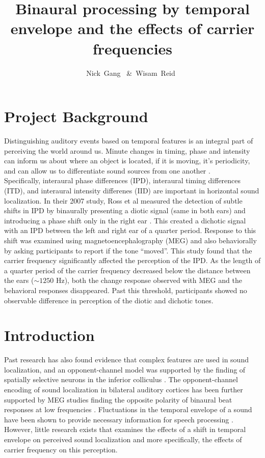 \documentclass[12pt,journal,compsoc,twocolumn]{IEEEtran}
\title{\textbf{Binaural processing by temporal envelope and the effects of carrier frequencies}}
\author{Nick~Gang~\IEEEmembership{}
        \&~Wisam~Reid~\IEEEmembership{}
\IEEEcompsocitemizethanks{\IEEEcompsocthanksitem W. Reid and N. Gang are with the Department
of Music, Stanford University,
CA, 94305.\protect
~Web: wisamreid.com, orangagang.com
}%
}
\begin{document}
\maketitle


\section{Project Background}
Distinguishing auditory events based on temporal features is an integral part of perceiving the world around us.  Minute changes in timing, phase and intensity can inform us about where an object is located, if it is moving, it’s periodicity, and can allow us to differentiate sound sources from one another \cite{Picton:2013}.\\

Specifically, interaural phase differences (IPD), interaural timing differences (ITD), and interaural intensity differenes (IID) are important in horizontal sound localization. In their 2007 study, Ross et al measured the detection of subtle shifts in IPD by binaurally presenting a diotic signal (same in both ears) and introducing a phase shift only in the right ear \cite{Ross2007}. This created a dichotic signal with an IPD between the left and right ear of a quarter period. Response to this shift was examined using magnetoencephalography (MEG) and also behaviorally by asking participants to report if the tone “moved”. This study found that the carrier frequency significantly affected the perception of the IPD. As the length of a quarter period of the carrier frequency decreased below the distance between the ears ($\sim 1250$ Hz), both the change response observed with MEG and the behavioral responses disappeared. Past this threshold, participants showed no observable difference in perception of the diotic and dichotic tones.
\section{Introduction}
Past research has also found evidence that complex features are used in sound localization, and an opponent-channel model was supported by the finding of spatially selective neurons in the inferior colliculus \cite{Grothe983}.   The opponent-channel encoding of sound localization in bilateral auditory cortices has been further supported by MEG studies finding the opposite polarity of binaural beat responses at low frequencies \cite{Ross1871}.  Fluctuations in the temporal envelope of a sound have been shown to provide necessary information for speech processing \cite{Liegeois-Chauvel2004}. However, little research exists that examines the effects of a shift in temporal envelope on perceived sound localization and more specifically, the effects of carrier frequency on this perception.\\
\end{document}
